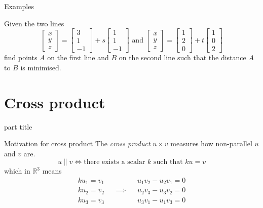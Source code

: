 \documentclass{beamer}
\begin{document}
\begin{frame}{Examples}
\begin{example}
Given the two lines
\begin{equation*}
\left[
\begin{array}{c}
x\\
y\\
z
\end{array}
\right] = \left[
\begin{array}{c}
3\\
1\\
-1
\end{array}
\right]+s \left[
\begin{array}{c}
1\\
1\\
-1
\end{array}
\right]\text{ and } \left[
\begin{array}{c}
x\\
y\\
z
\end{array}
\right] = \left[
\begin{array}{c}
1\\
2\\
0
\end{array}
\right] +t \left[
\begin{array}{c}
1\\
0\\
2
\end{array}
\right]
\end{equation*}
find points $A$ on the first line and $B$ on the second line such that the distance $A$ to $B$ is minimised.
\end{example}
\end{frame}

\section{Cross product}

\begin{frame}
\begin{beamercolorbox}[sep=12pt,center]{part title}
\insertsection\par
\end{beamercolorbox}
\end{frame}

\begin{frame}{Motivation for cross product}
The \emph{cross product} $u\times v$ measures how non-parallel $u$ and $v$ are.
\begin{equation*}
u \| v \iff \text{there exists a scalar $k$ such that } ku = v
\end{equation*}
which in $\mathbb{R}^3$ means
\begin{align*}
k u_1 = v_1 && &&u_1v_2 - u_2v_1 = 0\\
ku_2 = v_2 &&\implies & &u_2v_3 - u_3v_2 = 0\\
ku_3 = v_3 && & &u_3v_1 - u_1v_3 = 0
\end{align*}
\end{frame}
\end{document}
